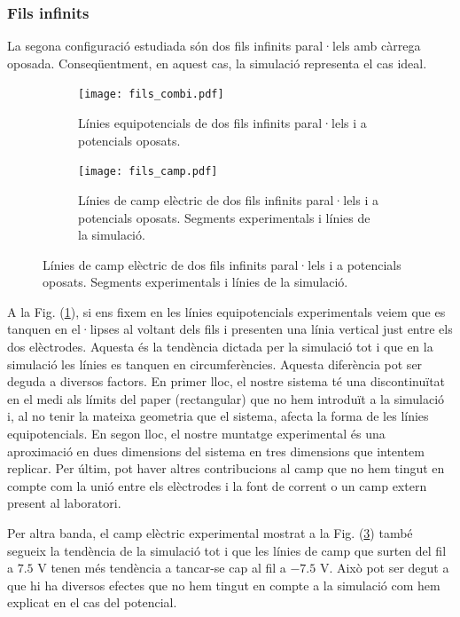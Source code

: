 \documentclass[11pt]{article}
\numberwithin{equation}{section}
\numberwithin{figure}{section}
\numberwithin{table}{section}
\begin{document}
\subsubsection{Fils infinits}\label{sec: fils}
La segona configuració estudiada són dos fils infinits paral·lels amb càrrega oposada. Conseqüentment, en aquest cas, la simulació representa el cas ideal.
\begin{figure}[h]
    \centering
    \begin{subfigure}{0.495\textwidth}
        \centering
        \texttt{[image: fils\_combi.pdf]}
        \caption{Línies equipotencials de dos fils infinits paral·lels i a potencials oposats.}
        \label{fig: fils_pot}
    \end{subfigure}
    \begin{subfigure}{0.495\textwidth} 
        \centering
        \texttt{[image: fils\_camp.pdf]}
        \caption{Línies de camp elèctric de dos fils infinits paral·lels i a potencials oposats. Segments experimentals i línies de la simulació.}
        \label{fig: fils_camp}
    \end{subfigure}
\end{figure}


A la Fig. (\ref{fig: fils_pot}), si ens fixem en les línies equipotencials experimentals veiem que es tanquen en el·lipses al voltant dels fils i presenten una línia vertical just entre els dos elèctrodes. Aquesta és la tendència dictada per la simulació tot i que en la simulació les línies es tanquen en circumferències. Aquesta diferència pot ser deguda a diversos factors. En primer lloc, el nostre sistema té una discontinuïtat en el medi als límits del paper (rectangular) que no hem introduït a la simulació i, al no tenir la mateixa geometria que el sistema, afecta la forma de les línies equipotencials. En segon lloc, el nostre muntatge experimental és una aproximació en dues dimensions del sistema en tres dimensions que intentem replicar. Per últim, pot haver altres contribucions al camp que no hem tingut en compte com la unió entre els elèctrodes i la font de corrent o un camp extern present al laboratori.

Per altra banda, el camp elèctric  experimental mostrat a la Fig. (\ref{fig: fils_camp}) també segueix la tendència de la simulació tot i que les línies de camp que surten del fil a $7.5$ V tenen més tendència a tancar-se cap al fil a $-7.5$ V. Això pot ser degut a que hi ha diversos efectes que no hem tingut en compte a la simulació com hem explicat en el cas del potencial. 
\end{document}
